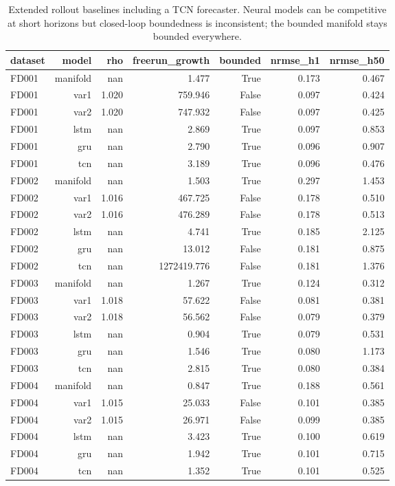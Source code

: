 \begin{table}[t]
\centering
\caption{Extended rollout baselines including a TCN forecaster. Neural models can be competitive at short horizons but closed-loop boundedness is inconsistent; the bounded manifold stays bounded everywhere.}
\label{tab:baselines_extended}
\begin{tabular}{lrrrrrr}
\toprule
dataset & model & rho & freerun\_growth & bounded & nrmse\_h1 & nrmse\_h50 \\
\midrule
FD001 & manifold & nan & 1.477 & True & 0.173 & 0.467 \\
FD001 & var1 & 1.020 & 759.946 & False & 0.097 & 0.424 \\
FD001 & var2 & 1.020 & 747.932 & False & 0.097 & 0.425 \\
FD001 & lstm & nan & 2.869 & True & 0.097 & 0.853 \\
FD001 & gru & nan & 2.790 & True & 0.096 & 0.907 \\
FD001 & tcn & nan & 3.189 & True & 0.096 & 0.476 \\
FD002 & manifold & nan & 1.503 & True & 0.297 & 1.453 \\
FD002 & var1 & 1.016 & 467.725 & False & 0.178 & 0.510 \\
FD002 & var2 & 1.016 & 476.289 & False & 0.178 & 0.513 \\
FD002 & lstm & nan & 4.741 & True & 0.185 & 2.125 \\
FD002 & gru & nan & 13.012 & False & 0.181 & 0.875 \\
FD002 & tcn & nan & 1272419.776 & False & 0.181 & 1.376 \\
FD003 & manifold & nan & 1.267 & True & 0.124 & 0.312 \\
FD003 & var1 & 1.018 & 57.622 & False & 0.081 & 0.381 \\
FD003 & var2 & 1.018 & 56.562 & False & 0.079 & 0.379 \\
FD003 & lstm & nan & 0.904 & True & 0.079 & 0.531 \\
FD003 & gru & nan & 1.546 & True & 0.080 & 1.173 \\
FD003 & tcn & nan & 2.815 & True & 0.080 & 0.384 \\
FD004 & manifold & nan & 0.847 & True & 0.188 & 0.561 \\
FD004 & var1 & 1.015 & 25.033 & False & 0.101 & 0.385 \\
FD004 & var2 & 1.015 & 26.971 & False & 0.099 & 0.385 \\
FD004 & lstm & nan & 3.423 & True & 0.100 & 0.619 \\
FD004 & gru & nan & 1.942 & True & 0.101 & 0.715 \\
FD004 & tcn & nan & 1.352 & True & 0.101 & 0.525 \\
\bottomrule
\end{tabular}
\end{table}